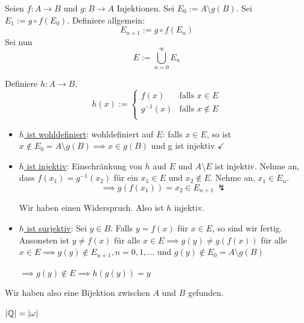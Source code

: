 \documentclass[12pt]{article}
\begin{document}
\begin{proofbox}
    Seien $f: A \rightarrow B$ und $g: B \rightarrow A$ Injektionen. Sei $E_0 := A \setminus g(B)$. Sei $E_1 := g \circ f(E_0)$. Definiere allgemein:
    $$
        E_{n + 1} := g \circ f (E_n)
    $$
    Sei nun
    $$
        E := \bigcup\limits_{n = 0}^{\infty} E_n
    $$

    Definiere $h: A \rightarrow B$,
    $$
        h(x) := \begin{cases}
            f(x) & \text{falls } x \in E \\
            g^{-1}(x) & \text{falls } x \notin E \\
        \end{cases}
    $$

    \begin{itemize}
        \item \underline{$h$ ist wohldefiniert}: wohldefiniert auf $E$: falls $x \in E$, so ist $x \notin E_0 = A \setminus g(B) \implies x \in g(B)$ und g ist injektiv $\checkmark$
        \item \underline{$h$ ist injektiv}: Einschränkung von $h$ aud $E$ und $A \setminus E$ ist injektiv. Nehme an, dass $f(x_1) = g^{-1}(x_2)$ für ein $x_1 \in E$ und $x_2 \notin E$. Nehme an, $x_1 \in E_n$.
        $$
            \implies g(f(x_1)) = x_2 \in E_{n + 1} \ \lightning
        $$

        Wir haben einen Widerspruch. Also ist $h$ injektiv.

        \item \underline{$h$ ist surjektiv}: Sei $y \in B$. Falls $y = f(x)$ für $x \in E$, so sind wir fertig. Ansonsten ist $y \neq f(x)$ für alle $x \in E \implies g(y) \neq g(f(x))$ für alle $x \in E \implies g(y) \notin E_{n+1}, n = 0,1,\dots$ und $g(y) \notin E_0 = A \setminus g(B)$
        
        $\implies g(y) \notin E \implies h(g(y)) = y$
    \end{itemize}

    Wir haben also eine Bijektion zwischen $A$ und $B$ gefunden.
\end{proofbox}

\begin{proposition}{}{}
    $|\mathbb{Q}| = |\omega|$
\end{proposition}
\end{document}
